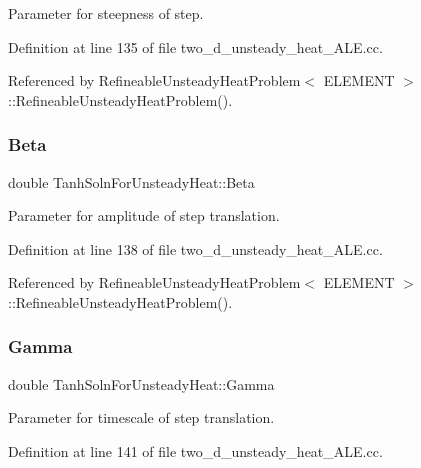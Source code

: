Parameter for steepness of step. 



Definition at line 135 of file two\+\_\+d\+\_\+unsteady\+\_\+heat\+\_\+\+A\+L\+E.\+cc.



Referenced by Refineable\+Unsteady\+Heat\+Problem$<$ E\+L\+E\+M\+E\+N\+T $>$\+::\+Refineable\+Unsteady\+Heat\+Problem().

\mbox{\label{namespaceTanhSolnForUnsteadyHeat_a66f6116310a5f9f96c2d3bf28250a92b}} 
\subsubsection{\texorpdfstring{Beta}{Beta}}
{\footnotesize\ttfamily double Tanh\+Soln\+For\+Unsteady\+Heat\+::\+Beta}



Parameter for amplitude of step translation. 



Definition at line 138 of file two\+\_\+d\+\_\+unsteady\+\_\+heat\+\_\+\+A\+L\+E.\+cc.



Referenced by Refineable\+Unsteady\+Heat\+Problem$<$ E\+L\+E\+M\+E\+N\+T $>$\+::\+Refineable\+Unsteady\+Heat\+Problem().

\mbox{\label{namespaceTanhSolnForUnsteadyHeat_a5bb742b074ab5f3f65286b1cff1f1512}} 
\subsubsection{\texorpdfstring{Gamma}{Gamma}}
{\footnotesize\ttfamily double Tanh\+Soln\+For\+Unsteady\+Heat\+::\+Gamma}



Parameter for timescale of step translation. 



Definition at line 141 of file two\+\_\+d\+\_\+unsteady\+\_\+heat\+\_\+\+A\+L\+E.\+cc.



